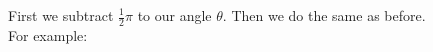 \documentclass[preview]{standalone}
\begin{document}
\begin{center}
First we subtract $\frac{1}{2} \pi$ to our angle $\theta$. Then we do the same as before. \\ For example:
\end{center}
\end{document}
